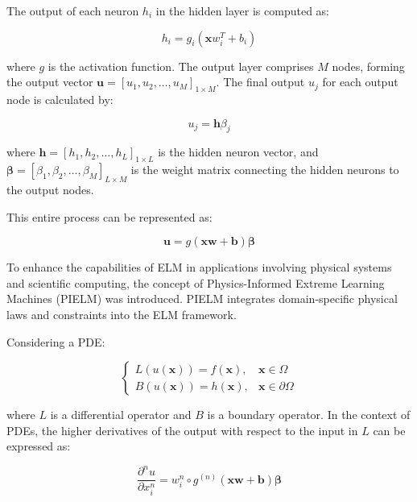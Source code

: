 \documentclass[11pt]{article}
\begin{document}
The output of each neuron $h_i$ in the hidden layer is computed as:

\begin{equation}
h_i = g_i(\mathbf{x}w_i^T + b_i)
\end{equation}

where $g$ is the activation function. The output layer comprises $M$ nodes, forming the output vector $\mathbf{u} = [u_1, u_2, \ldots, u_M]_{1 \times M}$. The final output $u_j$ for each output node is calculated by:

\begin{equation}
u_j = \mathbf{h}\beta_j
\end{equation}

where $\mathbf{h} = [h_1, h_2, \ldots, h_L]_{1 \times L}$ is the hidden neuron vector, and $\boldsymbol{\beta} = [\beta_1, \beta_2, \ldots, \beta_M]_{L \times M}$ is the weight matrix connecting the hidden neurons to the output nodes.

This entire process can be represented as:

\begin{equation}
\mathbf{u} = g(\mathbf{x}\mathbf{w} + \mathbf{b})\boldsymbol{\beta}
\end{equation}

To enhance the capabilities of ELM in applications involving physical systems and scientific computing, the concept of Physics-Informed Extreme Learning Machines (PIELM) was introduced. PIELM integrates domain-specific physical laws and constraints into the ELM framework.

Considering a PDE:

\begin{equation}
\begin{cases}
L(u(\mathbf{x})) = f(\mathbf{x}), & \mathbf{x} \in \Omega \\
B(u(\mathbf{x})) = h(\mathbf{x}), & \mathbf{x} \in \partial\Omega
\end{cases}
\end{equation}

where $L$ is a differential operator and $B$ is a boundary operator. In the context of PDEs, the higher derivatives of the output with respect to the input in $L$ can be expressed as:

\begin{equation}
\frac{\partial^n u}{\partial x_i^n} = w_i^n \circ g^{(n)}(\mathbf{x}\mathbf{w} + \mathbf{b})\boldsymbol{\beta}
\end{equation}
\end{document}
